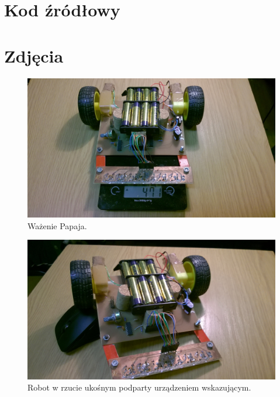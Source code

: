 \documentclass{article}
\begin{document}
\newpage

\section*{Kod źródłowy}


\newpage

\section*{Zdjęcia}

\begin{figure}[!htbp]
\centering
\includegraphics[scale=0.24]{./focie/wazymy_papaja.jpg}
\caption{Ważenie Papaja.}
\end{figure}

\begin{figure}[!htbp]
\centering
\includegraphics[scale=0.24]{./focie/oparcie_1.jpg}
\caption{Robot w rzucie ukośnym podparty urządzeniem wskazującym.}
\end{figure}
\end{document}

